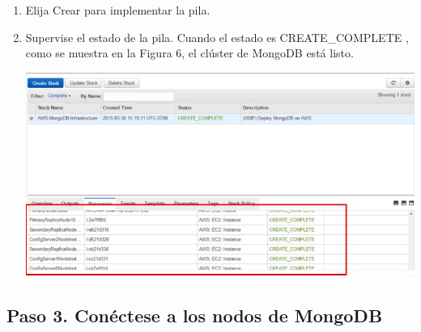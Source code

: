 \documentclass[12pt,letterpaper]{article}
\begin{document}
\begin{enumerate}
\begin{enumerate}
\begin{center}
	\end{center}
		\item Elija Crear para implementar la pila.
		\item Supervise el estado de la pila. Cuando el estado es CREATE_COMPLETE , como se muestra en la Figura 6, el clúster de MongoDB está listo.
		\begin{center}
			\includegraphics[width=14cm]{./img/2.8.jpg} 
		\end{center}
		
		\end{enumerate}
	\subsection{Paso 3. Conéctese a los nodos de MongoDB }


	\begin{enumerate}
		

\end{enumerate}
\end{enumerate}
\end{document}
